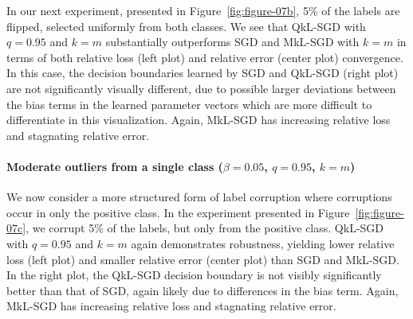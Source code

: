 \documentclass[11pt]{article}
\begin{document}
In our next experiment, presented in Figure~\ref{fig:figure-07b}, 5\% of the labels are flipped, selected uniformly from both classes. We see that QkL-SGD with $q=0.95$ and $k = m$ substantially outperforms SGD and MkL-SGD with $k = m$ in terms of both relative loss (left plot) and relative error (center plot) convergence.  In this case, the decision boundaries learned by SGD and QkL-SGD (right plot) are not significantly visually different, due to possible larger deviations between the bias terms in the learned parameter vectors which are more difficult to differentiate in this visualization.  Again, MkL-SGD has increasing relative loss and stagnating relative error.


\paragraph{Moderate outliers from a single class (\texorpdfstring{$\beta = 0.05$, $q=0.95$, $k = m$}{beta = 0.05, q = 0.95, k = m})}

We now consider a more structured form of label corruption where corruptions occur in only the positive class.  In the experiment presented in Figure~\ref{fig:figure-07c}, we corrupt 5\% of the labels, but only from the positive class. QkL-SGD with $q = 0.95$ and $k = m$ again demonstrates robustness, yielding lower relative loss (left plot) and smaller relative error (center plot) than SGD and MkL-SGD.  In the right plot, the QkL-SGD decision boundary is not visibly significantly better than that of SGD, again likely due to differences in the bias term. Again, MkL-SGD has increasing relative loss and stagnating relative error.
\end{document}
